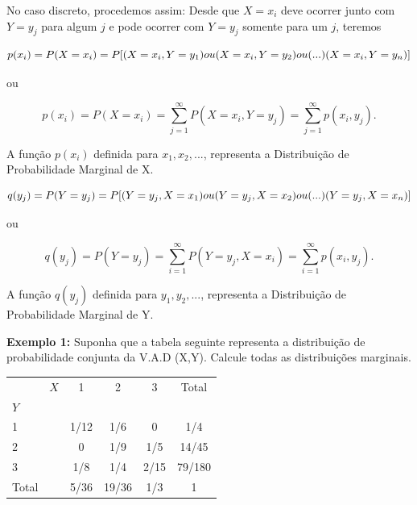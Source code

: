 \documentclass[a4paper,12pt]{report}
\begin{document}
{No caso discreto, procedemos assim: Desde que $X=x_{i}$ deve
ocorrer junto com $Y=y_{j}$ para algum $j$ e pode ocorrer com
$Y=y_{j}$ somente para um $j$, teremos


\begin{equation}\label{}\footnotesize
    p(x_{i})=P(X=x_{i})=P[(X=x_{i},Y=y_{1})ou(X=x_{i},Y=y_{2})ou (...)(X=x_{i},Y=y_{n})]
\end{equation}

ou

\begin{equation}\label{}
    p(x_{i})=P(X=x_{i})=
    \sum^{\infty}_{j=1}P(X=x_{i},Y=y_{j})=\sum^{\infty}_{j=1}p(x_{i},y_{j}).
\end{equation}

A função $p(x_{i})$ definida para $x_{1},x_{2},...$, representa a
Distribuição de Probabilidade Marginal de X.


\begin{equation}\label{}\footnotesize
    q(y_{j})=P(Y=y_{j})=P[(Y=y_{j},X=x_{1})ou(Y=y_{j},X=x_{2})ou (...)(Y=y_{j},X=x_{n})]
\end{equation}

ou

\begin{equation}\label{}
    q(y_{j})=P(Y=y_{j})=
    \sum^{\infty}_{i=1}P(Y=y_{j},X=x_{i})=\sum^{\infty}_{i=1}p(x_{i},y_{j}).
\end{equation}


A função $q(y_{j})$ definida para $y_{1},y_{2},...$, representa a
Distribuição de Probabilidade Marginal de Y.\vskip0.3cm

\textbf{Exemplo 1:} Suponha que a tabela seguinte representa a
distribuição de probabilidade conjunta da V.A.D (X,Y). Calcule
todas as distribuições marginais.

\begin{table}[!htp]
\centering
\begin{tabular}{lr|ccc|c}
\hline\hline
      & $X$ & 1    & 2     & 3    & Total \\
%
  $Y$ &     &      &       &      &  \\
 \hline
  1   &     & 1/12 & 1/6   & 0    & 1/4 \\
%
  2   &     & 0    & 1/9   & 1/5  & 14/45 \\
%
  3   &     & 1/8  & 1/4   & 2/15 & 79/180 \\ \hline
%
Total &     & 5/36 & 19/36 & 1/3  & 1 \\
\hline\hline
\end{tabular}
\end{table}

}
\end{document}
